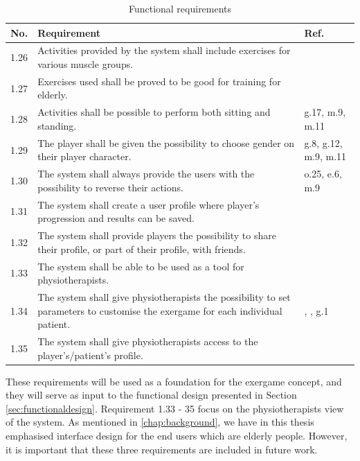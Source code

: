 \begin{table} [H]
\centering
\begin{tabular}{|>{\raggedright}p{}|p{}|p{}|}
\hline
\textbf{No.} & \textbf{Requirement} & \textbf{Ref.} \\ \hline
1.26 & Activities provided by the system shall include exercises for various muscle groups. & \cite{guidelines} \\ \hline
1.27 & Exercises used shall be proved to be good for training for elderly. & \cite{project} \cite{john2012smartsenior}\\ \hline
1.28 & Activities shall be possible to perform both sitting and standing. & g.17, m.9, m.11 \\ \hline
1.29 & The player shall be given the possibility to choose gender on their player character. &  g.8, g.12, m.9, m.11 \\ \hline
1.30 & The system shall always provide the users with the possibility to reverse their actions. & o.25, e.6, m.9 \\ \hline
1.31 & The system shall create a user profile where player's progression and results can be saved. & \cite{project} \cite{john2012smartsenior} \\ \hline
1.32 & The system shall provide players the possibility to share their profile, or part of their profile, with friends. &  \cite{sweetser} \\ \hline
1.33 & The system shall be able to be used as a tool for physiotherapists. & \cite{project} \cite{john2012smartsenior}\\ \hline
1.34 & The system shall give physiotherapists the possibility to set parameters to customise the exergame for each individual patient. & \cite{project}, \cite{john2012smartsenior}, g.1  \\ \hline
1.35 & The system shall give physiotherapists access to the player's/patient's profile. & \cite{project} \cite{john2012smartsenior}\\ \hline  
\end{tabular}
\caption[Functional requirements, part 3]{Functional requirements}
\label{tab:func3}
\end{table} 

These requirements will be used as a foundation for the exergame concept, and they will serve as input to the functional design presented in Section \ref{sec:functionaldesign}. Requirement 1.33 - 35 focus on the physiotherapists view of the system. As mentioned in \ref{chap:background}, we have in this thesis emphasised interface design for the end users which are elderly people. However, it is important that these three requirements are included in future work.

